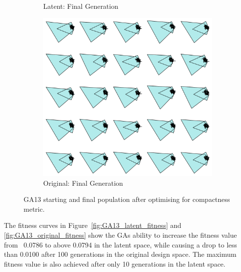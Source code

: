 \documentclass{article}
\begin{document}
\begin{figure}[H]
\begin{subfigure}[b]{0.32\textwidth}
        \caption{Latent: Final Generation}
        \label{fig:GA13_latent_final}
    \end{subfigure}
    \hfill
    \begin{subfigure}[b]{0.32\textwidth}
        \centering
        \includegraphics[width=\textwidth]{figures/GAResults/GA13/original/original_final_gen.png}
        \caption{Original: Final Generation}
        \label{fig:GA13_original_final}
    \end{subfigure}
    \caption{GA13 starting and final population after optimising for compactness metric.}
    \label{fig:GA13_before_after_GA}
\end{figure}
The fitness curves in Figure~\ref{fig:GA13_latent_fitness} and \ref{fig:GA13_original_fitness} show the GAs ability to increase the fitness value from ~0.0786 to above 0.0794 in the latent space, while causing a drop to less than 0.0100 after 100 generations in the original design space. The maximum fitness value is also achieved after only 10 generations in the latent space. 
\end{document}
